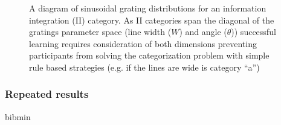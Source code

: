 \documentclass[doc,12pt]{apa}        %
\begin{document}
\begin{figure}[tp]
	\label{fig:II}
	\caption{A diagram of sinusoidal grating distributions for an information integration (II) category.  As II categories span the diagonal of the gratings parameter space (line width ($W$) and angle ($\theta$)) successful learning requires consideration of both dimensions preventing participants from solving the categorization problem with simple rule based strategies (e.g. if the lines are wide is category ``a'')}
\end{figure}

\subsubsection{Repeated results}


\newpage
 {bibmin}
\end{document}
